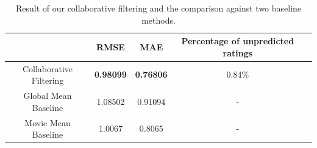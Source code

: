 \begin{table}[!ht]
  \centering
  \begin{tabular}{|c|c|c|c|c|}
    \hline & RMSE & MAE & Percentage of unpredicted ratings \\ \hline
    Collaborative Filtering & \textbf{0.98099} & \textbf{0.76806} &
    0.84\%\\ \hline Global Mean Baseline & 1.08502 & 0.91094 & -
    \\ \hline Movie Mean Baseline & 1.0067 & 0.8065 & - \\ \hline
  \end{tabular}
  \caption{Result of our collaborative filtering and the comparison
    against two baseline methods.}
  \label{tab:finres}
\end{table}
